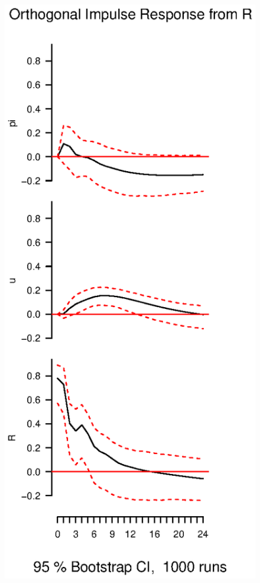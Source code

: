 \documentclass{beamer}
\begin{document}
\begin{frame}
  \begin{figure}
    \includegraphics[scale=.4]{interest_shock.eps}
  \end{figure}
\end{frame}
\end{document}
